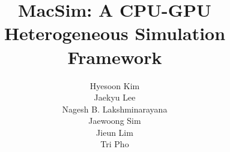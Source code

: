 \documentclass[11pt, letterpaper]{article}
\begin{document}
\title{MacSim: A CPU-GPU Heterogeneous Simulation Framework}

\author{Hyesoon Kim\\
Jaekyu Lee\\
Nagesh B. Lakshminarayana\\
Jaewoong Sim\\
Jieun Lim\\
Tri Pho}

\maketitle
\thispagestyle{empty}

\clearpage

\tableofcontents

\clearpage





%











%
%
\clearpage




\end{document}

